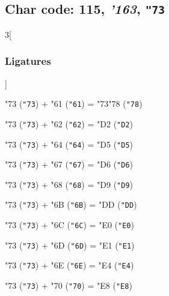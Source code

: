 \documentclass{article}
\newlength{\maxcharwidth}
\begin{document}
\subsection{Char code: 115, {\it'163}, {\tt"73}}
\label{char_115}


\begin{multicols}{3}[\subsubsection{Ligatures}]

{\testfont\char"73\noboundary} ({\tt"73}) + {\testfont\char"61\noboundary} ({\tt"61}) = {\testfont\char"73\noboundary}{\testfont\char"78\noboundary} ({\tt"78}) 

{\testfont\char"73\noboundary} ({\tt"73}) + {\testfont\char"62\noboundary} ({\tt"62}) = {\testfont\char"D2\noboundary} ({\tt"D2}) 

{\testfont\char"73\noboundary} ({\tt"73}) + {\testfont\char"64\noboundary} ({\tt"64}) = {\testfont\char"D5\noboundary} ({\tt"D5}) 

{\testfont\char"73\noboundary} ({\tt"73}) + {\testfont\char"67\noboundary} ({\tt"67}) = {\testfont\char"D6\noboundary} ({\tt"D6}) 

{\testfont\char"73\noboundary} ({\tt"73}) + {\testfont\char"68\noboundary} ({\tt"68}) = {\testfont\char"D9\noboundary} ({\tt"D9}) 

{\testfont\char"73\noboundary} ({\tt"73}) + {\testfont\char"6B\noboundary} ({\tt"6B}) = {\testfont\char"DD\noboundary} ({\tt"DD}) 

{\testfont\char"73\noboundary} ({\tt"73}) + {\testfont\char"6C\noboundary} ({\tt"6C}) = {\testfont\char"E0\noboundary} ({\tt"E0}) 

{\testfont\char"73\noboundary} ({\tt"73}) + {\testfont\char"6D\noboundary} ({\tt"6D}) = {\testfont\char"E1\noboundary} ({\tt"E1}) 

{\testfont\char"73\noboundary} ({\tt"73}) + {\testfont\char"6E\noboundary} ({\tt"6E}) = {\testfont\char"E4\noboundary} ({\tt"E4}) 

{\testfont\char"73\noboundary} ({\tt"73}) + {\testfont\char"70\noboundary} ({\tt"70}) = {\testfont\char"E8\noboundary} ({\tt"E8}) 


\end{multicols}
\end{document}
